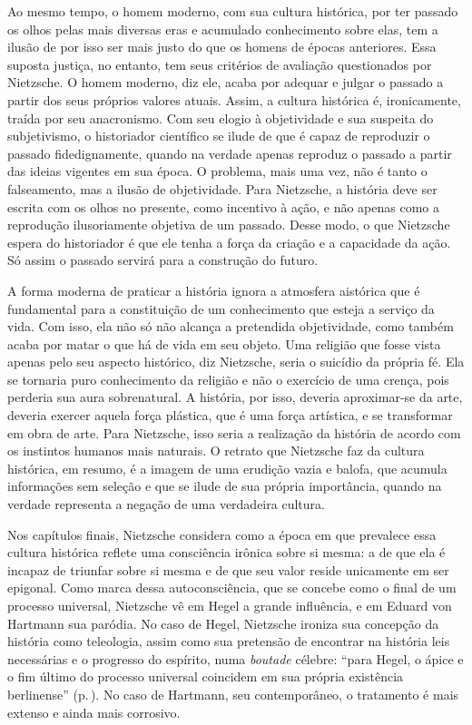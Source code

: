 Ao mesmo tempo, o homem moderno, com sua cultura histórica, por ter
passado os olhos pelas mais diversas eras e acumulado conhecimento sobre
elas, tem a ilusão de por isso ser mais justo do que os homens de épocas
anteriores. Essa suposta justiça, no entanto, tem seus critérios de
avaliação questionados por Nietzsche. O homem moderno, diz ele, acaba
por adequar e julgar o passado a partir dos seus próprios valores
atuais. Assim, a cultura histórica é, ironicamente, traída por seu
anacronismo. Com seu elogio à objetividade e sua suspeita do
subjetivismo, o historiador científico se ilude de que é capaz de
reproduzir o passado fidedignamente, quando na verdade apenas reproduz o
passado a partir das ideias vigentes em sua época. O problema, mais uma
vez, não é tanto o falseamento, mas a ilusão de objetividade. Para
Nietzsche, a história deve ser escrita com os olhos no presente, como
incentivo à ação, e não apenas como a reprodução ilusoriamente objetiva
de um passado. Desse modo, o que Nietzsche espera do historiador é que
ele tenha a força da criação e a capacidade da ação. Só assim o passado
servirá para a construção do futuro.

A forma moderna de praticar a história ignora a atmosfera aistórica que
é fundamental para a constituição de um conhecimento que esteja a
serviço da vida. Com isso, ela não só não alcança a pretendida
objetividade, como também acaba por matar o que há de vida em seu
objeto. Uma religião que fosse vista apenas pelo seu aspecto histórico,
diz Nietzsche, seria o suicídio da própria fé. Ela se tornaria puro
conhecimento da religião e não o exercício de uma crença, pois perderia
sua aura sobrenatural. A história, por isso, deveria aproximar-se da
arte, deveria exercer aquela força plástica, que é uma força artística,
e se transformar em obra de arte. Para Nietzsche, isso seria a
realização da história de acordo com os instintos humanos mais naturais.
O retrato que Nietzsche faz da cultura histórica, em resumo, é a imagem
de uma erudição vazia e balofa, que acumula informações sem seleção e
que se ilude de sua própria importância, quando na verdade representa a
negação de uma verdadeira cultura.

Nos capítulos finais, Nietzsche considera como a época em que prevalece
essa cultura histórica reflete uma consciência irônica sobre si mesma: a
de que ela é incapaz de triunfar sobre si mesma e de que seu valor
reside unicamente em ser epigonal. Como marca dessa autoconsciência, que
se concebe como o final de um processo universal, Nietzsche vê em Hegel
a grande influência, e em Eduard von Hartmann sua paródia. No caso de
Hegel, Nietzsche ironiza sua concepção da história como teleologia,
assim como sua pretensão de encontrar na história leis necessárias e o
progresso do espírito, numa \emph{boutade} célebre: ``para Hegel, o
ápice e o fim último do processo universal coincidem em sua própria
existência berlinense'' (p.\,\pageref{existenciaberlinense}). 
No caso de Hartmann, seu contemporâneo, o
tratamento é mais extenso e ainda mais corrosivo.

